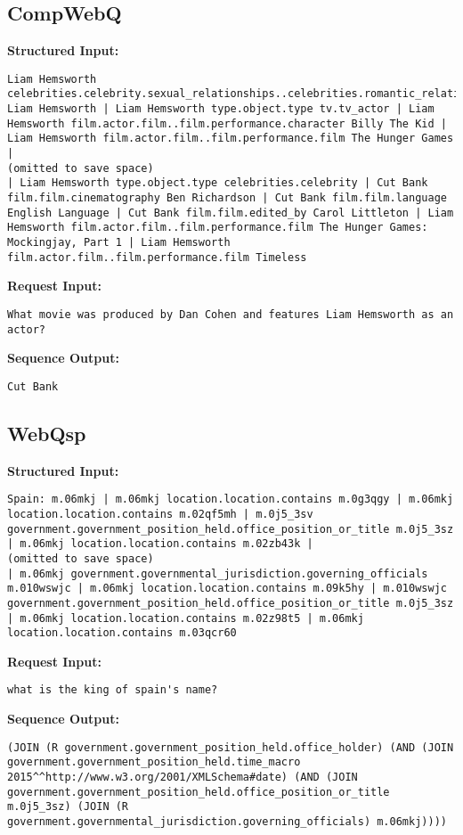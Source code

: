 \documentclass[11pt]{article}
\begin{document}
\subsection{CompWebQ}
\textbf{Structured Input:} 
\begin{lstlisting}
Liam Hemsworth celebrities.celebrity.sexual_relationships..celebrities.romantic_relationship.celebrity Liam Hemsworth | Liam Hemsworth type.object.type tv.tv_actor | Liam Hemsworth film.actor.film..film.performance.character Billy The Kid | Liam Hemsworth film.actor.film..film.performance.film The Hunger Games | 
(omitted to save space)
| Liam Hemsworth type.object.type celebrities.celebrity | Cut Bank film.film.cinematography Ben Richardson | Cut Bank film.film.language English Language | Cut Bank film.film.edited_by Carol Littleton | Liam Hemsworth film.actor.film..film.performance.film The Hunger Games: Mockingjay, Part 1 | Liam Hemsworth film.actor.film..film.performance.film Timeless
\end{lstlisting}
\textbf{Request Input:} 
\begin{lstlisting}
What movie was produced by Dan Cohen and features Liam Hemsworth as an actor?
\end{lstlisting}
\textbf{Sequence Output:} 
\begin{lstlisting}
Cut Bank
\end{lstlisting}

\subsection{WebQsp}
\textbf{Structured Input:} 
\begin{lstlisting}
Spain: m.06mkj | m.06mkj location.location.contains m.0g3qgy | m.06mkj location.location.contains m.02qf5mh | m.0j5_3sv government.government_position_held.office_position_or_title m.0j5_3sz | m.06mkj location.location.contains m.02zb43k | 
(omitted to save space)
| m.06mkj government.governmental_jurisdiction.governing_officials m.010wswjc | m.06mkj location.location.contains m.09k5hy | m.010wswjc government.government_position_held.office_position_or_title m.0j5_3sz | m.06mkj location.location.contains m.02z98t5 | m.06mkj location.location.contains m.03qcr60
\end{lstlisting}
\textbf{Request Input:} 
\begin{lstlisting}
what is the king of spain's name?
\end{lstlisting}
\textbf{Sequence Output:} 
\begin{lstlisting}
(JOIN (R government.government_position_held.office_holder) (AND (JOIN government.government_position_held.time_macro 2015^^http://www.w3.org/2001/XMLSchema#date) (AND (JOIN government.government_position_held.office_position_or_title m.0j5_3sz) (JOIN (R government.governmental_jurisdiction.governing_officials) m.06mkj))))
\end{lstlisting}
\end{document}
